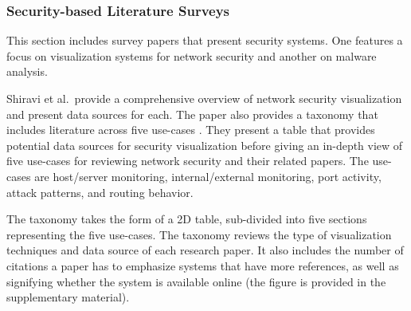 \subsubsection{Security-based Literature Surveys}
This section includes survey papers that present security systems. One features a focus on visualization systems for network security and  another on malware analysis.

Shiravi et al.\  provide a comprehensive overview of network security visualization and present data sources for each. The paper also provides a taxonomy that includes literature across five use-cases \cite{shiravi2012survey}.
They present a table that provides potential data sources for security visualization before giving an in-depth view of five use-cases for reviewing network security and their related papers. The use-cases are host/server monitoring, internal/external monitoring, port activity, attack patterns, and routing behavior.

The taxonomy takes the form of a 2D table, sub-divided into five sections representing the five use-cases. The taxonomy reviews the type of visualization techniques and data source of each research paper. It also includes the number of citations a paper has to emphasize systems that have more references, as well as signifying whether the system is available online (the figure is provided in the supplementary material).

